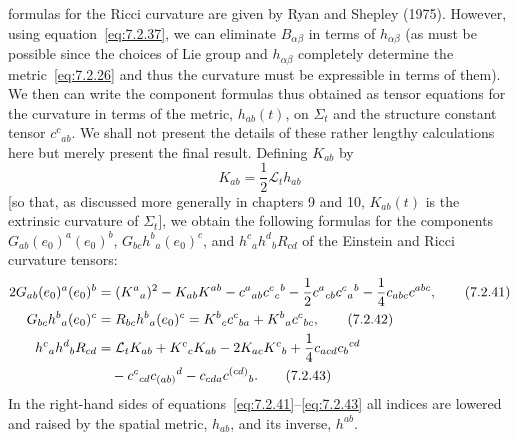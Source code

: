 formulas for the Ricci curvature are given by Ryan and Shepley (1975). However,
using equation~\eqref{eq:7.2.37}, we can eliminate \(B_{\alpha\beta}\) in terms
of \(h_{\alpha\beta}\) (as must be possible since the choices of Lie group and
\(h_{\alpha\beta}\) completely determine the metric~\eqref{eq:7.2.26} and thus
the curvature must be expressible in terms of them). We then can write the
component formulas thus obtained as tensor equations for the curvature in terms of
the metric, \(h_{ab}(t)\), on \(\Sigma_t\) and the structure constant tensor
\(c^c{}_{ab}\). We shall not present the details of these rather lengthy calculations
here but merely present the final result. Defining \(K_{ab}\) by
\begin{equation}
  K_{ab}=\frac12\mathcal L_th_{ab}
  \tag{7.2.40}\label{eq:7.2.40}
\end{equation}
[so that, as discussed more generally in chapters 9 and 10, \(K_{ab}(t)\) is the
extrinsic curvature of \(\Sigma_t\)], we obtain the following formulas for the
components \(G_{ab}(e_0)^a(e_0)^b\), \(G_{bc}h^b{}_a(e_0)^c\), and
\(h^c{}_ah^d{}_bR_{cd}\) of the Einstein and Ricci curvature tensors:
\begin{align}
  2G_{ab}(e_0)^a(e_0)^b
    &=(K^a{}_a)^2-K_{ab}K^{ab}
      -c^a{}_{ab}c^c{}_c{}^b
      -\frac12c^a{}_{cb}c^c{}_a{}^b
      -\frac14c_{abc}c^{abc} ,
  \tag{7.2.41}\label{eq:7.2.41}\\
  G_{bc}h^b{}_a(e_0)^c
    &=R_{bc}h^b{}_a(e_0)^c
      =K^b{}_cc^c{}_{ba}+K^b{}_ac^c{}_{bc} ,
  \tag{7.2.42}\label{eq:7.2.42}\\
  h^c{}_ah^d{}_bR_{cd}
    &=\mathcal L_tK_{ab}+K^c{}_cK_{ab}-2K_{ac}K^c{}_b
      +\frac14c_{acd}c_b{}^{cd} \notag\\
    &\quad-c^c{}_{cd}c_{(ab)}{}^d-c_{cda}c^{(cd)}{}_b .
  \tag{7.2.43}\label{eq:7.2.43}
\end{align}
In the right-hand sides of equations~\eqref{eq:7.2.41}--\eqref{eq:7.2.43} all
indices are lowered and raised by the spatial metric, \(h_{ab}\), and its inverse,
\(h^{ab}\).

